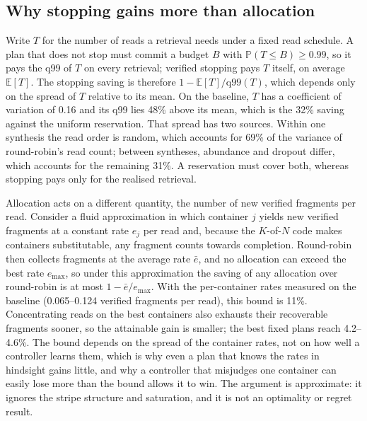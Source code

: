 \documentclass[acmsmall,screen]{acmart}
\newcommand{\E}{\mathbb{E}}
\newcommand{\Prob}{\mathbb{P}}
\begin{document}
\subsection{Why stopping gains more than allocation}\label{sec:disc-theory}
Write $T$ for the number of reads a retrieval needs under a fixed read schedule.  A plan that does not
stop must commit a budget $B$ with $\Prob(T\le B)\ge0.99$, so it pays the q99 of $T$ on every retrieval;
verified stopping pays $T$ itself, on average $\E[T]$.  The stopping saving is therefore
$1-\E[T]/\mathrm{q99}(T)$, which depends only on the spread of $T$ relative to its mean.  On the baseline,
$T$ has a coefficient of variation of 0.16 and its q99 lies 48\% above its mean, which is
the 32\% saving against the uniform reservation.  That spread has two sources.  Within one synthesis the
read order is random, which accounts for 69\% of the variance of round-robin's read count;
between syntheses, abundance and dropout differ, which accounts for the remaining 31\%.  A
reservation must cover both, whereas stopping pays only for the realised retrieval.

Allocation acts on a different quantity, the number of new verified fragments per read.  Consider a fluid
approximation in which container $j$ yields new verified fragments at a constant rate $e_j$ per read and,
because the $K$-of-$N$ code makes containers substitutable, any fragment counts towards completion.
Round-robin then collects fragments at the average rate $\bar e$, and no allocation can exceed the best
rate $e_{\max}$, so under this approximation the saving of any allocation over round-robin is at most
$1-\bar e/e_{\max}$.  With the per-container rates measured on the baseline (0.065--0.124 verified
fragments per read), this bound is 11\%.  Concentrating reads on the best containers also
exhausts their recoverable fragments sooner, so the attainable gain is smaller; the best fixed plans
reach 4.2--4.6\%.  The bound depends on the spread of the container rates, not on how well a controller
learns them, which is why even a plan that knows the rates in hindsight gains little, and why a
controller that misjudges one container can easily lose more than the bound allows it to win.  The
argument is approximate: it ignores the stripe structure and saturation, and it is not an optimality or
regret result.
\end{document}
